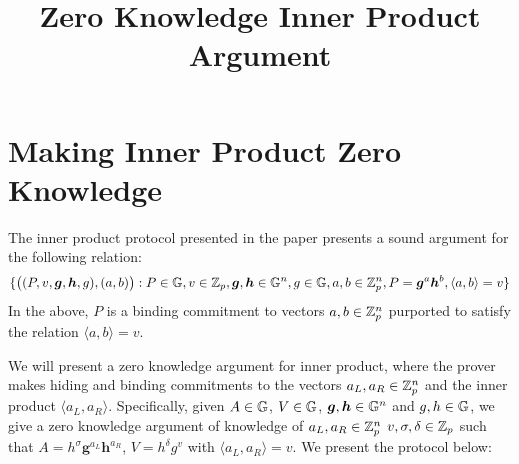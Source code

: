 \documentclass[11pt]{article}
\title{Zero Knowledge Inner Product Argument}
\begin{document}
\maketitle


\section{Making Inner Product Zero Knowledge}
The inner product protocol presented in the paper \cite[Section 3]{Bulletproofs}
presents a sound argument for the following relation:
\begin{align}\label{eq:ipa}
\{\big((P,v,\bm{g},\bm{h},g), (a,b)\big): P\in \mathbb{G}, v\in \mathbb{Z}_p,
\bm{g},\bm{h}\in \mathbb{G}^n, g\in \mathbb{G}, a,b\in \mathbb{Z}_p^n, P=\bm{g}^a\bm{h}^b,\langle
a,b\rangle = v\}
\end{align}
In the above, $P$ is a binding commitment to vectors $a,b\in \mathbb{Z}_p^n$ purported
to satisfy the relation $\langle a,b \rangle = v$.
 
We will present a zero knowledge argument for inner product, where the prover
makes hiding and binding commitments to the vectors $a_L,a_R\in \mathbb{Z}_p^n$ and  
the inner product $\langle a_L,a_R\rangle$. Specifically, given $A\in \mathbb{G}$,
$V\in \mathbb{G}$, $\bm{g},\bm{h}\in \mathbb{G}^n$ and $g,h\in \mathbb{G}$, we give a zero knowledge
argument of knowledge of $a_L,a_R\in \mathbb{Z}_p^n$ $v,\sigma,\delta\in \mathbb{Z}_p$
such that $A=h^\sigma\bm{g}^{a_L}\bm{h}^{a_R}$, $V=h^\delta g^v$ with
$\langle a_L,a_R\rangle = v$. We present the protocol below:
\end{document}
